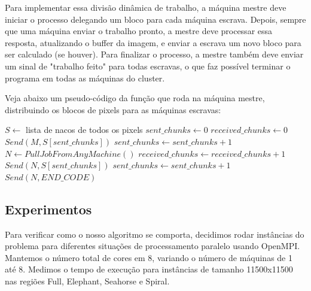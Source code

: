 \documentclass[12pt]{article}
\begin{document}
Para implementar essa divisão dinâmica de trabalho, a máquina mestre 
deve iniciar o processo delegando um bloco para cada máquina escrava.
Depois, sempre que uma máquina enviar o trabalho pronto, a mestre deve
processar essa resposta, atualizando o buffer da imagem, e enviar a
escrava um novo bloco para ser calculado (se houver). Para finalizar o
processo, a mestre também deve enviar um sinal de "trabalho feito" para
todas escravas, o que faz possível terminar o programa em todas as 
máquinas do cluster.

Veja abaixo um pseudo-código da função que roda na máquina mestre, 
distribuindo os blocos de pixels para as máquinas escravas:
\begin{algorithmic}[1]
    \State $S \gets $ lista de nacos de todos os pixels
    \State $sent\_chunks \gets 0$
    \State $received\_chunks \gets 0$ 
        \State $Send (M, S[sent\_chunks])$
        \State $sent\_chunks \gets sent\_chunks + 1$
    \EndFor
        \State $N \gets PullJobFromAnyMachine ()$
        \State $received\_chunks \gets received\_chunks + 1$
            \State $Send (N, S[sent\_chunks])$
            \State $sent\_chunks \gets sent\_chunks + 1$
        \Else
            \State $Send (N, END\_CODE)$
        \EndIf
    \EndWhile
\EndFunction
\end{algorithmic}

\subsection{Experimentos}
Para verificar como o nosso algoritmo se comporta, decidimos rodar 
instâncias do problema para diferentes situações de processamento 
paralelo usando OpenMPI. Mantemos o número total de cores em 8, variando
o número de máquinas de 1 até 8. Medimos o tempo de execução para 
instâncias de tamanho 11500x11500 nas regiões Full, Elephant, Seahorse e
Spiral.
\end{document}
